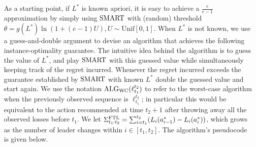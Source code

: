 
As a starting point, if $L^*$ is known apriori, it is easy to achieve a $\frac{e}{e-1}$ approximation by simply using $\text{SMART}$ with (random) threshold $\theta = g(L^*)\ln(1+(e-1)U), U \sim \mathrm{Unif}[0,1]$. When $L^*$ is not known, we use a guess-and-double argument to devise an algorithm that achieves the following instance-optimality guarantee. The intuitive idea behind the algorithm is to guess the value of $L^*$, and play $\text{SMART}$ with this guessed value while simultaneously keeping track of the regret incurred. Whenever the regret incurred exceeds the guarantee established by $\text{SMART}$ with known $L^*$ double the guessed value and start again. We use the notation $\text{ALG}_{\text{WC}}(\ell_{t_1}^{t_2})$ to refer to the worst-case algorithm when the previously observed sequence is $\ell_{t_1}^{t_2}$; in particular this would be equivalent to the action recommended at time $t_2 + 1$ after throwing away all the observed losses before $t_1$. 
We let $\Sigma^{\text{FTL}}_{t_1:t_2} = 
\sum_{i=t_1}^{t_2} (L_i(a^*_{i-1}) - L_i(a^*_i))$, which grows as the number of leader changes within $i \in [t_1, t_2]$. The algorithm's pseudocode is given below.



